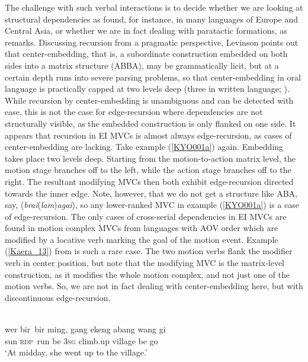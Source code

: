 The challenge with such verbal interactions is to decide whether we are looking at structural dependencies as found, for instance, in many languages of Europe and Central Asia, or whether we are in fact dealing with paratactic formations, as \citep[151]{levinson2013recursion} remarks. Discussing recursion from a pragmatic perspective, Levinson points out that center-embedding, that is, a subordinate construction embedded on both sides into a matrix structure (ABBA), may be grammatically licit, but at a certain depth runs into severe parsing problems, so that center-embedding in oral language is practically capped at two levels deep (three in written language; \citealt[154]{levinson2013recursion}). While recursion by center-embedding is unambiguous and can be detected with ease, this is not the case for edge-recursion where dependencies are not structurally visible, as the embedded construction is only flanked on one side. It appears that recursion in EI MVCs is almost always edge-recursion, as cases of center-embedding are lacking. Take example (\ref{KYO001a}) again. Embedding takes place two levels deep. Starting from the motion-to-action matrix level, the motion stage branches off to the left, while the action stage branches off to the right. The resultant modifying MVCs then both exhibit edge-recursion directed towards the inner edge. Note, however, that we do not get a structure like ABA, say, (\textit{brai}(\textit{lam})\textit{agai}), so any lower-ranked MVC in example (\ref{KYO001a}) is a case of edge-recursion. The only cases of cross-serial dependencies in EI MVCs are found in motion complex MVCs from languages with AOV order which are modified by a locative verb marking the goal of the motion event. Example (\ref{Kaera_13}) from  is such a rare case. The two motion verbs flank the modifier verb in center position, but note that the modifying MVC is the matrix-level construction, as it modifies the whole motion complex, and not just one of the motion verbs. So, we are not in fact dealing with center-embedding here, but with discontinuous edge-recursion.

\ea \label{Kaera_13}
\\
\gll wer bir~bir ming, gang ekeng abang wang gi \\
sun \textsc{rdp}~run be 3\textsc{sg} climb.up village be go \\
\glft `At midday, she went up to the village.'\\
\z

